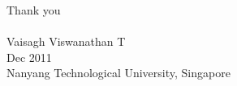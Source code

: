 
\begin{acknowledgements}
Thank you
\\
\\
\hspace{0in}
Vaisagh Viswanathan T\\
Dec 2011\\
{Nanyang Technological University, Singapore}\\
\end{acknowledgements}